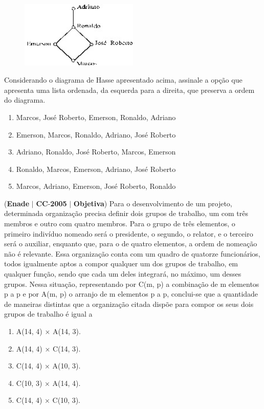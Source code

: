 \documentclass{exam}
\begin{document}
\begin{questions}
\begin{figure}[H]
	\begin{center}
		\includegraphics[width=0.5\textwidth]{CIENCIA_DA_COMPUTACAO_Prova2005-utf8_figuras/fig-0017.jpg}
	\end{center}
\end{figure}
Considerando o diagrama de Hasse apresentado acima,
assinale a opção que apresenta uma lista ordenada, da
esquerda para a direita, que preserva a ordem do diagrama.
	\begin{enumerate}[label=\alph*)]
		\item  Marcos, José Roberto, Emerson, Ronaldo, Adriano
		\item  Emerson, Marcos, Ronaldo, Adriano, José Roberto
		\item  Adriano, Ronaldo, José Roberto, Marcos, Emerson
		\item  Ronaldo, Marcos, Emerson, Adriano, José Roberto
		\item  Marcos, Adriano, Emerson, José Roberto, Ronaldo
	\end{enumerate}

\question (\textbf{Enade} $|$ \textbf{CC}-\textbf{2005} $|$ \textbf{Objetiva})
Para o desenvolvimento de um projeto,
determinada organização precisa definir dois grupos de
trabalho, um com três membros e outro com quatro
membros. Para o grupo de três elementos, o primeiro
indivíduo nomeado será o presidente, o segundo, o
relator, e o terceiro será o auxiliar, enquanto que, para
o de quatro elementos, a ordem de nomeação não é
relevante. Essa organização conta com um quadro de
quatorze funcionários, todos igualmente aptos a compor
qualquer um dos grupos de trabalho, em qualquer
função, sendo que cada um deles integrará, no máximo,
um desses grupos.
Nessa situação, representando por C(m, p) a combinação de
m elementos p a p e por A(m, p) o arranjo de m elementos
p a p, conclui-se que a quantidade de maneiras distintas que a
organização citada dispõe para compor os seus dois grupos de
trabalho é igual a
	\begin{enumerate}[label=\alph*)]
		\item  A(14, 4) × A(14, 3).
		\item  A(14, 4) × C(14, 3).
		\item  C(14, 4) × A(10, 3).
		\item  C(10, 3) × A(14, 4).
		\item  C(14, 4) × C(10, 3).
	\end{enumerate}


\end{questions}
\end{document}
